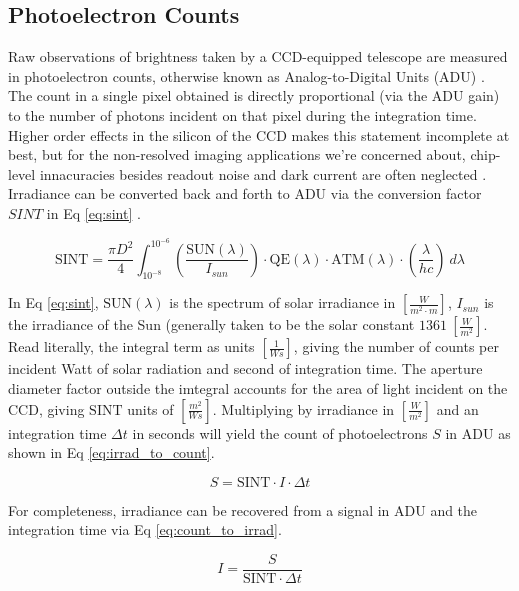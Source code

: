 \subsection{Photoelectron Counts}

Raw observations of brightness taken by a CCD-equipped telescope are measured in photoelectron
counts, otherwise known as Analog-to-Digital Units (ADU) \cite{krag2003}. The count in a single
pixel obtained is directly proportional (via the ADU gain) to the number of
photons incident on that pixel during the integration time. Higher order effects in the silicon of
the CCD makes this statement incomplete at best, but for the non-resolved imaging applications we're
concerned about, chip-level innacuracies besides readout noise and dark current are often neglected
\cite{frueh2019notes}. Irradiance can be converted back and forth to ADU via the conversion factor $SINT$
in Eq \ref{eq:sint} \cite{krag2003}.

\begin{equation} \label{eq:sint}
 \textrm{SINT} = \frac{\pi D^2}{4}
	\int_{10^{-8}}^{10^{-6}}{ \left( \frac{\textrm{SUN}(\lambda)}{I_{sun}} \right) \cdot \textrm{QE}(\lambda) \cdot \textrm{ATM}(\lambda)
  \cdot \left( \frac{\lambda}{h c} \right) \: d\lambda}  
\end{equation}

In Eq \ref{eq:sint}, $\textrm{SUN}(\lambda)$ is the spectrum of solar irradiance in 
$\left[\frac{W}{m^2\cdot m} \right]$, $I_{sun}$ is the irradiance of the Sun (generally taken to be
the solar constant $1361 \: \left[ \frac{W}{m^2} \right]$. Read literally, the integral term as
units $\left[ \frac{1}{Ws} \right]$, giving the number of counts per incident Watt of solar
radiation and second of integration time. The aperture diameter factor outside the imtegral accounts
for the area of light incident on the CCD, giving $\textrm{SINT}$ units of $\left[ \frac{m^2}{Ws}
\right]$. Multiplying by irradiance in $\left[ \frac{W}{m^2} \right]$ and an integration time $\Delta t$ 
in seconds will yield the count of photoelectrons $S$ in ADU as shown in Eq \ref{eq:irrad_to_count}.

\begin{equation} \label{eq:irrad_to_count}
  S = \textrm{SINT} \cdot I \cdot \Delta t
\end{equation}

For completeness, irradiance can be recovered from a signal in ADU and the integration time via Eq
\ref{eq:count_to_irrad}.

\begin{equation} \label{eq:count_to_irrad}
  I = \frac{S}{\textrm{SINT} \cdot \Delta t}
\end{equation}

